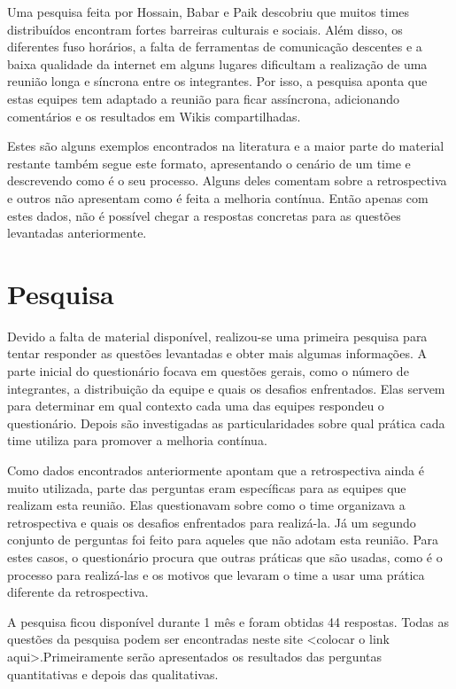 \documentclass[12pt]{article}
\begin{document}
Uma pesquisa feita por Hossain, Babar e Paik \cite{gsd:09} descobriu que muitos times distribuídos encontram fortes barreiras culturais e sociais. Além disso, os diferentes fuso horários, a falta de ferramentas de comunicação descentes e a baixa qualidade da internet em alguns lugares dificultam a realização de uma reunião longa e síncrona entre os integrantes. Por isso, a pesquisa aponta que estas equipes tem adaptado a reunião para ficar assíncrona, adicionando comentários e os resultados em Wikis compartilhadas. 

Estes são alguns exemplos encontrados na literatura e a maior parte do material restante também segue este formato, apresentando o cenário de um time e descrevendo como é o seu processo. Alguns deles comentam sobre a retrospectiva e outros não apresentam como é feita a melhoria contínua. Então apenas com estes dados, não é possível chegar a respostas concretas para as questões levantadas anteriormente.

\section{Pesquisa} \label{sec:firstpage}

Devido a falta de material disponível, realizou-se uma primeira pesquisa  para tentar responder as questões levantadas e obter mais algumas informações. A parte inicial do questionário focava em questões gerais, como o número de integrantes, a distribuição da equipe e quais os desafios enfrentados. Elas servem para determinar em qual contexto cada uma das equipes respondeu o questionário. Depois são investigadas as particularidades sobre qual prática cada time utiliza para promover a melhoria contínua.

Como dados encontrados anteriormente apontam que a retrospectiva ainda é muito utilizada, parte das perguntas eram específicas para as equipes que realizam esta reunião. Elas questionavam sobre como o time organizava a retrospectiva e quais os desafios enfrentados para realizá-la. Já um segundo conjunto de perguntas foi feito para aqueles que não adotam esta reunião. Para estes casos, o questionário procura que outras práticas que são usadas, como é o processo para realizá-las e os motivos que levaram o time a usar uma prática diferente da retrospectiva.

A pesquisa ficou disponível durante 1 mês e foram obtidas 44 respostas. Todas as questões da pesquisa podem ser encontradas neste site <colocar o link aqui>.Primeiramente serão apresentados os resultados das perguntas quantitativas e depois das qualitativas.
\end{document}

